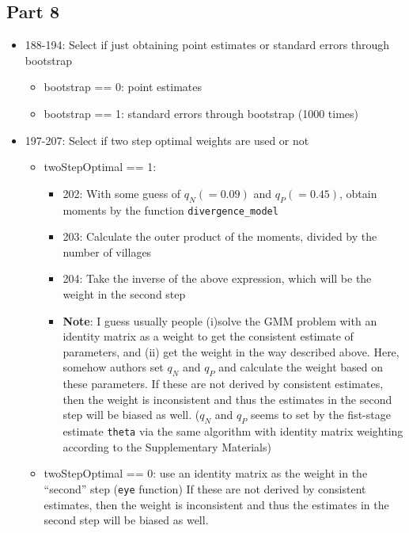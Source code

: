 \documentclass[10pt,letterpaper]{article}
\begin{document}
\begin{itemize}
\subsection*{Part 8}
\begin{itemize}
  \item 188-194: Select if just obtaining point estimates or standard errors through bootstrap
    \begin{itemize}
      \item bootstrap == 0: point estimates
      \item bootstrap == 1: standard errors through bootstrap (1000 times)
    \end{itemize}
  \item 197-207: Select if two step optimal weights are used or not
    \begin{itemize}
      \item twoStepOptimal == 1: 
        \begin{itemize}
          \item 202: With some guess of $q_N (= 0.09)$ and $q_P (= 0.45)$, obtain moments by the function \texttt{divergence\_model}
          \item 203: Calculate the outer product of the moments, divided by the number of villages
          \item 204: Take the inverse of the above expression, which will be the weight in the second step
          \item \textbf{Note}: I guess usually people 
            (i)solve the GMM problem with an identity matrix as a weight to get the consistent estimate of parameters, and 
            (ii) get the weight in the way described above.
            Here, somehow authors set $q_N$ and $q_P$ and calculate the weight based on these parameters.
            If these are not derived by consistent estimates, then the weight is inconsistent and thus the estimates in the second step will be biased as well. ($q_N$ and $q_P$ seems to set by the fist-stage estimate \texttt{theta} via the same algorithm with identity matrix weighting according to the Supplementary Materials)
        \end{itemize}
      \item twoStepOptimal == 0: use an identity matrix as the weight in the ``second'' step (\texttt{eye} function)
            If these are not derived by consistent estimates, then the weight is inconsistent and thus the estimates in the second step will be biased as well.
        \end{itemize}

\end{itemize}
\end{itemize}
\end{document}
